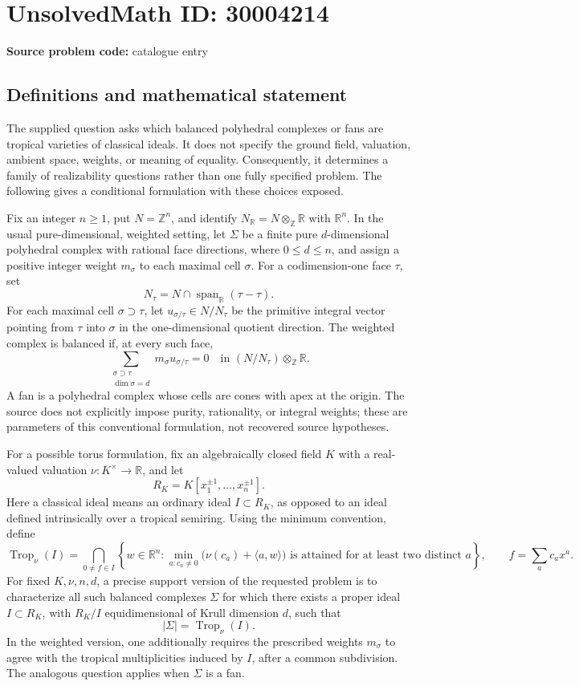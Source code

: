 \documentclass[11pt]{article}
\newcommand{\Z}{\mathbb{Z}}
\newcommand{\R}{\mathbb{R}}
\begin{document}
\section*{UnsolvedMath ID: 30004214}
\textbf{Source problem code:} catalogue entry
\subsection{Definitions and mathematical statement}
The supplied question asks which balanced polyhedral complexes or fans are tropical varieties of classical ideals. It does not specify the ground field, valuation, ambient space, weights, or meaning of equality. Consequently, it determines a family of realizability questions rather than one fully specified problem. The following gives a conditional formulation with these choices exposed.

Fix an integer \(n\geq 1\), put \(N=\Z^n\), and identify \(N_{\R}=N\otimes_{\Z}\R\) with \(\R^n\). In the usual pure-dimensional, weighted setting, let \(\Sigma\) be a finite pure \(d\)-dimensional polyhedral complex with rational face directions, where \(0\leq d\leq n\), and assign a positive integer weight \(m_\sigma\) to each maximal cell \(\sigma\). For a codimension-one face \(\tau\), set
\[
N_\tau=N\cap\operatorname{span}_{\R}(\tau-\tau).
\]
For each maximal cell \(\sigma\supset\tau\), let \(u_{\sigma/\tau}\in N/N_\tau\) be the primitive integral vector pointing from \(\tau\) into \(\sigma\) in the one-dimensional quotient direction. The weighted complex is balanced if, at every such face,
\[
\sum_{\substack{\sigma\supset\tau\\ \dim\sigma=d}}
 m_\sigma u_{\sigma/\tau}=0
\quad\text{in }(N/N_\tau)\otimes_{\Z}\R.
\]
A fan is a polyhedral complex whose cells are cones with apex at the origin. The source does not explicitly impose purity, rationality, or integral weights; these are parameters of this conventional formulation, not recovered source hypotheses.

For a possible torus formulation, fix an algebraically closed field \(K\) with a real-valued valuation \(\nu:K^\times\to\R\), and let
\[
R_K=K[x_1^{\pm1},\ldots,x_n^{\pm1}].
\]
Here a classical ideal means an ordinary ideal \(I\subset R_K\), as opposed to an ideal defined intrinsically over a tropical semiring. Using the minimum convention, define
\[
\operatorname{Trop}_\nu(I)=
\bigcap_{0\ne f\in I}
\left\{w\in\R^n:
\min_{a:c_a\ne0}\bigl(\nu(c_a)+\langle a,w\rangle\bigr)
\text{ is attained for at least two distinct }a
\right\},
\qquad f=\sum_a c_a x^a.
\]
For fixed \(K,\nu,n,d\), a precise support version of the requested problem is to characterize all such balanced complexes \(\Sigma\) for which there exists a proper ideal \(I\subset R_K\), with \(R_K/I\) equidimensional of Krull dimension \(d\), such that
\[
|\Sigma|=\operatorname{Trop}_\nu(I).
\]
In the weighted version, one additionally requires the prescribed weights \(m_\sigma\) to agree with the tropical multiplicities induced by \(I\), after a common subdivision. The analogous question applies when \(\Sigma\) is a fan.
\end{document}
